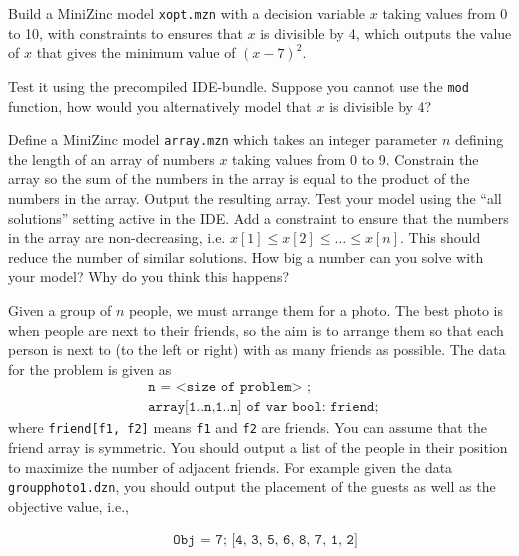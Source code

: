 \documentclass[a4paper,10pt,fleqn]{article}
\begin{document}
\kopfErsteSeite
\kopfAngabe


Build a MiniZinc model \texttt{xopt.mzn} with a decision variable $x$ taking values from 0 to 10, with
constraints to ensures that $x$ is divisible by 4, which outputs the value of $x$ that gives the minimum
value of $(x-7)^2$.

Test it using the precompiled IDE-bundle. Suppose you cannot use the \texttt{mod} function, how would you alternatively model that $x$
is divisible by 4?

Define a MiniZinc model \texttt{array.mzn} which takes an integer parameter $n$ defining the length of an
array of numbers $x$ taking values from 0 to 9. Constrain the array so the sum of the numbers in
the array is equal to the product of the numbers in the array. Output the resulting array.
Test your model using the ``all solutions'' setting active in the IDE. Add a constraint to ensure that the numbers in the array are non-decreasing, i.e. $x[1] \leq x[2] \leq
\ldots \leq x[n]$. This should reduce the number of similar solutions. 
How big a number can you solve with your model? Why do you think this happens?

Given a group of $n$ people, we must arrange them for a photo. The best
photo is when people are next to their friends, so the aim is to arrange them so that each person
is next to (to the left or right) with as many friends as possible. The data for the
problem is given as
%
\begin{align*}
& \texttt{n = <size of problem> ;} \\
& \texttt{array[1..n,1..n] of var bool: friend; }
\end{align*} 
%
where \texttt{friend[f1, f2]} means \texttt{f1} and \texttt{f2} are friends. You can assume that the friend array is symmetric.
You should output a list of the people in their position to maximize the number of adjacent
friends. For example given the data \texttt{groupphoto1.dzn}, you should output the placement of the guests as well as the objective value, i.e.,

\begin{align*}
& \texttt{Obj = 7; [4, 3, 5, 6, 8, 7, 1, 2]}
\end{align*}
\end{document}
